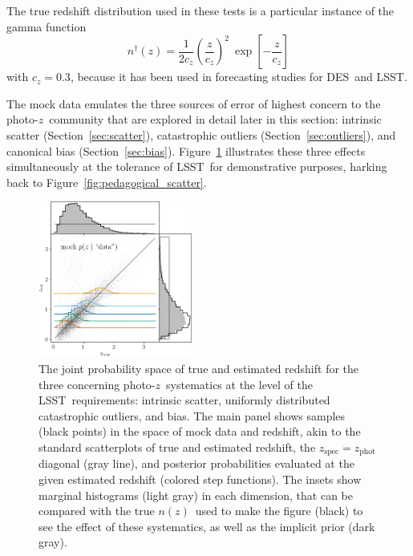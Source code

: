 \documentclass[iop]{emulateapj}
\newcommand{\todo}[3]{{\color{#2}\emph{#1}: #3}}
\newcommand{\aim}[1]{\todo{AIM}{red}{#1}}
\newcommand{\Sect}[1]{Section~\ref{#1}}
\newcommand{\Fig}[1]{Figure~\ref{#1}}
\newcommand{\project}[1]{\textsc{#1}}
\newcommand{\lsst}{\project{LSST}}
\newcommand{\des}{\project{DES}}
\newcommand{\pz}{photo-$z$}
\newcommand{\nz}{$n(z)$}
\begin{document}
The true redshift distribution used in these tests is a particular instance of the gamma function
\begin{equation}
\label{eqn:gamma}
n^{\dagger}(z) = \frac{1}{2 c_{z}} \left(\frac{z}{c_{z}}\right)^{2}\ \exp\left[-\frac{z}{c_{z}}\right]
\end{equation}
with $c_{z} = 0.3$, because it has been used in forecasting studies for \des\ and \lsst.

The mock data emulates the three sources of error of highest concern to the \pz\ community that are explored in detail later in this section: intrinsic scatter (\Sect{sec:scatter}), catastrophic outliers (\Sect{sec:outliers}), and canonical bias (\Sect{sec:bias}).
\Fig{fig:mega_scatter} illustrates these three effects simultaneously at the tolerance of \lsst\ for demonstrative purposes, harking back to Figure~\ref{fig:pedagogical_scatter}.

\begin{figure}%
	\begin{center}
		\includegraphics[width=0.45\textwidth]{figures/chippr/single_lsst-mega_scatter.png}
		\caption{
			The joint probability space of true and estimated redshift for the three concerning \pz\ systematics at the level of the \lsst\ requirements:
			intrinsic scatter, uniformly distributed catastrophic outliers, and bias.
			The main panel shows samples (black points) in the space of mock data and redshift, akin to the standard scatterplots of true and estimated redshift, the $z_{\mathrm{spec}} = z_{\mathrm{phot}}$ diagonal (gray line), and posterior probabilities evaluated at the given estimated redshift (colored step functions).
			The insets show marginal histograms (light gray) in each dimension, that can be compared with the true \nz\ used to make the figure (black) to see the effect of these systematics, as well as the implicit prior (dark gray).
		}
		\label{fig:mega_scatter}
	\end{center}
\end{figure}
\end{document}

